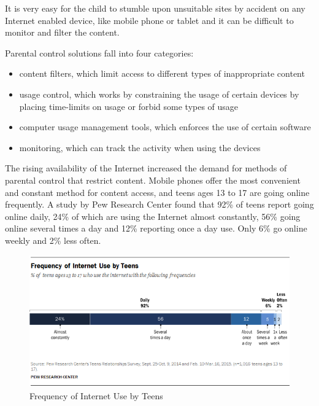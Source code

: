 It is very easy for the child to stumble upon unsuitable sites by accident on any Internet enabled device, like mobile phone or tablet and it can be difficult to monitor and filter the content. \parencite{innapropriateContent}

Parental control solutions fall into four categories:

\begin{itemize}
\item content filters, which limit access to different types of inappropriate content
\item usage control, which works by constraining the usage of certain devices by placing time-limits on usage or forbid some types of usage
\item computer usage management tools, which enforces the use of certain software
\item monitoring, which can track the activity when using the devices
\end{itemize}

The rising availability of the Internet increased the demand for methods of parental control that restrict content. Mobile phones offer the most convenient and constant method for content access, and teens ages 13 to 17 are going online frequently. A study by Pew Research Center found that 92\% of teens report going online daily, 24\% of which are using the Internet almost constantly, 56\% going online several times a day and 12\% reporting once a day use. Only 6\% go online weekly and 2\% less often. \parencite{lenhart2015teens}

\begin{figure}[th]
\centering
\includegraphics[width=1\textwidth]{Figures/frequency-of-internet-use-by-teens}
\decoRule
\caption[Frequency of Internet Use by Teens]{Frequency of Internet Use by Teens}
\label{fig:frequency-of-internet-use-by-teens}
\end{figure}

